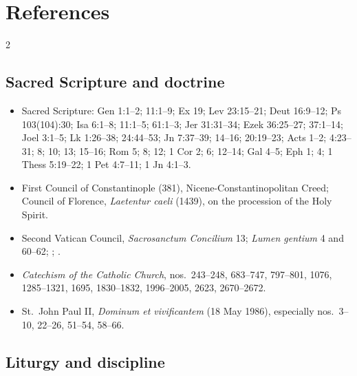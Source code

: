 \section{References}

\begin{multicols}{2}
\fontsize{8.25}{9.6}\selectfont
\RaggedRight
\setlength{\emergencystretch}{1em}

\subsection{Sacred Scripture and doctrine}

\begin{itemize}
\item Sacred Scripture: Gen 1:1--2; 11:1--9; Ex 19; Lev 23:15--21; Deut 16:9--12; Ps 103(104):30; Isa 6:1--8; 11:1--5; 61:1--3; Jer 31:31--34; Ezek 36:25--27; 37:1--14; Joel 3:1--5; Lk 1:26--38; 24:44--53; Jn 7:37--39; 14--16; 20:19--23; Acts 1--2; 4:23--31; 8; 10; 13; 15--16; Rom 5; 8; 12; 1 Cor 2; 6; 12--14; Gal 4--5; Eph 1; 4; 1 Thess 5:19--22; 1 Pet 4:7--11; 1 Jn 4:1--3.
\item First Council of Constantinople (381), Nicene-Constantinopolitan Creed; Council of Florence, \textit{Laetentur caeli} (1439), on the procession of the Holy Spirit.
\item Second Vatican Council, \textit{Sacrosanctum Concilium} 13; \textit{Lumen gentium} 4 and 60--62; ; .
\item \textit{Catechism of the Catholic Church}, nos.~243--248, 683--747, 797--801, 1076, 1285--1321, 1695, 1830--1832, 1996--2005, 2623, 2670--2672.
\item St.~John Paul II, \textit{Dominum et vivificantem} (18 May 1986), especially nos.~3--10, 22--26, 51--54, 58--66.
\end{itemize}

\subsection{Liturgy and discipline}


\end{multicols}
